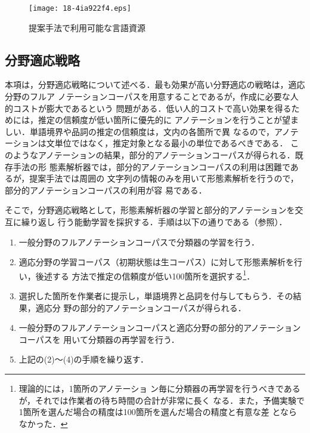 \documentclass[japanese]{jnlp_1.4}
\def\figref#1{}
\begin{document}
\begin{figure}[t]
  \begin{center}
\texttt{[image: 18-4ia922f4.eps]}
  \end{center}
  \caption{提案手法で利用可能な言語資源}
  \label{figure:LR}
\end{figure}



\subsection{分野適応戦略}
\label{subsection:戦略}

本項は，分野適応戦略について述べる．最も効果が高い分野適応の戦略は，適応分野のフルア
ノテーションコーパスを用意することであるが，作成に必要な人的コストが膨大であるという
問題がある．低い人的コストで高い効果を得るためには，推定の信頼度が低い箇所に優先的に
アノテーションを行うことが望ましい．単語境界や品詞の推定の信頼度は，文内の各箇所で異
なるので，アノテーションは文単位ではなく，推定対象となる最小の単位であるべきである．
このようなアノテーションの結果，部分的アノテーションコーパスが得られる．既存手法の形
態素解析器では，部分的アノテーションコーパスの利用は困難であるが，提案手法では周囲の
文字列の情報のみを用いて形態素解析を行うので，部分的アノテーションコーパスの利用が容
易である．

そこで，分野適応戦略として，形態素解析器の学習と部分的アノテーションを交互に繰り返し
行う能動学習を採択する．手順は以下の通りである（\figref{figure:AL}参照）．
\begin{enumerate}

\item 一般分野のフルアノテーションコーパスで分類器の学習を行う．

\item 適応分野の学習コーパス（初期状態は生コーパス）に対して形態素解析を行い，後述する
  方法で推定の信頼度が低い100箇所を選択する\footnote{理論的には，1箇所のアノテーショ
  ン毎に分類器の再学習を行うべきであるが，それでは作業者の待ち時間の合計が非常に長く
  なる．また，予備実験で1箇所を選んだ場合の精度は100箇所を選んだ場合の精度と有意な差
  とならなかった．}．

\item 選択した箇所を作業者に提示し，単語境界と品詞を付与してもらう．その結果，適応分
  野の部分的アノテーションコーパスが得られる．

\item 一般分野のフルアノテーションコーパスと適応分野の部分的アノテーションコーパスを
  用いて分類器の再学習を行う．

\item 上記の(2)〜(4)の手順を繰り返す．

\end{enumerate}
\end{document}
